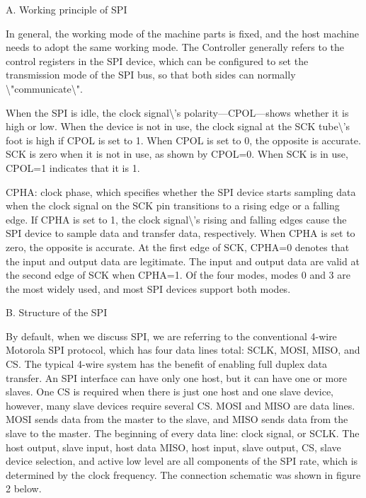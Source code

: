 \documentclass[12pt,a4paper]{article}
\numberwithin{equation}{section}
\begin{document}
A.  Working principle of SPI

    In general, the working mode of the machine parts is fixed, and the
    host machine needs to adopt the same working mode. The Controller
    generally refers to the control registers in the SPI device, which
    can be configured to set the transmission mode of the SPI bus, so
    that both sides can normally \textbackslash{}"communicate\textbackslash{}".

    When the SPI is idle, the clock signal\textbackslash{}'s polarity---CPOL---shows
    whether it is high or low. When the device is not in use, the clock
    signal at the SCK tube\textbackslash{}'s foot is high if CPOL is set to 1. When
    CPOL is set to 0, the opposite is accurate. SCK is zero when it is
    not in use, as shown by CPOL=0. When SCK is in use, CPOL=1 indicates
    that it is 1.

    CPHA: clock phase, which specifies whether the SPI device starts
    sampling data when the clock signal on the SCK pin transitions to a
    rising edge or a falling edge. If CPHA is set to 1, the clock
    signal\textbackslash{}'s rising and falling edges cause the SPI device to sample
    data and transfer data, respectively. When CPHA is set to zero, the
    opposite is accurate. At the first edge of SCK, CPHA=0 denotes that
    the input and output data are legitimate. The input and output data
    are valid at the second edge of SCK when CPHA=1. Of the four modes,
    modes 0 and 3 are the most widely used, and most SPI devices support
    both modes.

B.  Structure of the SPI

    By default, when we discuss SPI, we are referring to the
    conventional 4-wire Motorola SPI protocol, which has four data lines
    total: SCLK, MOSI, MISO, and CS. The typical 4-wire system has the
    benefit of enabling full duplex data transfer. An SPI interface can
    have only one host, but it can have one or more slaves. One CS is
    required when there is just one host and one slave device, however,
    many slave devices require several CS. MOSI and MISO are data lines.
    MOSI sends data from the master to the slave, and MISO sends data
    from the slave to the master. The beginning of every data line:
    clock signal, or SCLK. The host output, slave input, host data MISO,
    host input, slave output, CS, slave device selection, and active low
    level are all components of the SPI rate, which is determined by the
    clock frequency. The connection schematic was shown in figure 2
    below.
\end{document}
